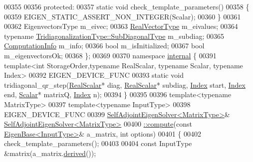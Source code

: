 \begin{DoxyCode}
00355 
00356   \textcolor{keyword}{protected}:
00357     \textcolor{keyword}{static} \textcolor{keywordtype}{void} check\_template\_parameters()
00358     \{
00359       EIGEN\_STATIC\_ASSERT\_NON\_INTEGER(Scalar);
00360     \}
00361     
00362     EigenvectorsType m\_eivec;
00363     \hyperlink{class_eigen_1_1internal_1_1_tensor_lazy_evaluator_writable}{RealVectorType} m\_eivalues;
00364     \textcolor{keyword}{typename} \hyperlink{group___core___module_class_eigen_1_1_matrix}{TridiagonalizationType::SubDiagonalType} m\_subdiag;
00365     \hyperlink{group__enums_ga85fad7b87587764e5cf6b513a9e0ee5e}{ComputationInfo} m\_info;
00366     \textcolor{keywordtype}{bool} m\_isInitialized;
00367     \textcolor{keywordtype}{bool} m\_eigenvectorsOk;
00368 \};
00369 
00370 \textcolor{keyword}{namespace }\hyperlink{namespaceinternal}{internal} \{
00391 \textcolor{keyword}{template}<\textcolor{keywordtype}{int} StorageOrder,\textcolor{keyword}{typename} RealScalar, \textcolor{keyword}{typename} Scalar, \textcolor{keyword}{typename} Index>
00392 EIGEN\_DEVICE\_FUNC
00393 \textcolor{keyword}{static} \textcolor{keywordtype}{void} tridiagonal\_qr\_step(\hyperlink{group___eigenvalues___module_a5dae5f422a3c71060e6bd31332bf64fd}{RealScalar}* diag, \hyperlink{group___eigenvalues___module_a5dae5f422a3c71060e6bd31332bf64fd}{RealScalar}* subdiag, 
      \hyperlink{group___eigenvalues___module_a8a59ab7734b6eae2754fd78bc7c3a360}{Index} start, \hyperlink{group___eigenvalues___module_a8a59ab7734b6eae2754fd78bc7c3a360}{Index} end, \hyperlink{group___eigenvalues___module_a0bfcedf4245b6846007ca4f01e4feb1f}{Scalar}* matrixQ, \hyperlink{group___eigenvalues___module_a8a59ab7734b6eae2754fd78bc7c3a360}{Index} n);
00394 \}
00395 
00396 \textcolor{keyword}{template}<\textcolor{keyword}{typename} MatrixType>
00397 \textcolor{keyword}{template}<\textcolor{keyword}{typename} InputType>
00398 EIGEN\_DEVICE\_FUNC
00399 \hyperlink{group___eigenvalues___module_class_eigen_1_1_self_adjoint_eigen_solver}{SelfAdjointEigenSolver<MatrixType>}& 
      \hyperlink{group___eigenvalues___module_a88bcdc24112efa7c4d2ebb3476efcbe9}{SelfAdjointEigenSolver<MatrixType>}
00400 \hyperlink{group___eigenvalues___module_a88bcdc24112efa7c4d2ebb3476efcbe9}{::compute}(\textcolor{keyword}{const} \hyperlink{group___core___module_struct_eigen_1_1_eigen_base}{EigenBase<InputType>}& a\_matrix, \textcolor{keywordtype}{int} options)
00401 \{
00402   check\_template\_parameters();
00403   
00404   \textcolor{keyword}{const} InputType &matrix(a\_matrix.\hyperlink{group___core___module_a324b16961a11d2ecfd2d1b7dd7946545}{derived}());

\end{DoxyCode}
